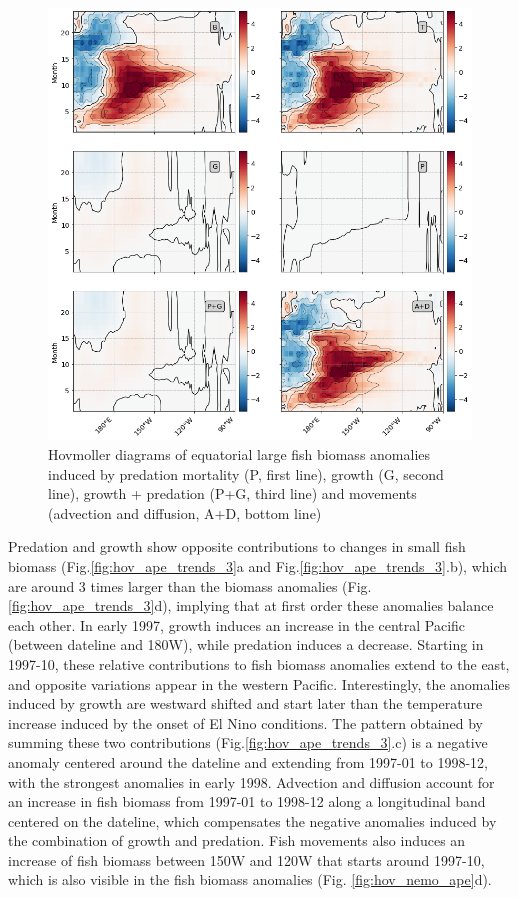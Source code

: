 \begin{figure}
	\centering
	\includegraphics[scale=0.4]{figs/hov_compo_l_90.png}	
	\caption{Hovmoller diagrams of equatorial large fish biomass anomalies induced by predation mortality (P, first line), growth (G, second line), growth + predation (P+G, third line) and movements (advection and diffusion, A+D, bottom line)}	
	\label{fig:hov_ape_trends_90}
\end{figure}


Predation and growth show opposite contributions to changes in small fish biomass (Fig.\ref{fig:hov_ape_trends_3}a and Fig.\ref{fig:hov_ape_trends_3}.b), which are around 3 times larger than the biomass anomalies (Fig. \ref{fig:hov_ape_trends_3}d), implying that at first order these anomalies balance each other. In early 1997, growth induces an increase in the central Pacific (between dateline and 180W), while predation induces a decrease. Starting in 1997-10, these relative contributions to fish biomass anomalies extend to the east, and opposite variations appear in the western Pacific. Interestingly, the anomalies induced by growth are westward shifted and start later than the temperature increase induced by the onset of El Nino conditions. The pattern obtained by summing these two contributions (Fig.\ref{fig:hov_ape_trends_3}.c) is a negative anomaly centered around the dateline and extending from 1997-01 to 1998-12, with the strongest anomalies in early 1998. Advection and diffusion account for an increase in fish biomass from 1997-01 to 1998-12 along a longitudinal band centered on the dateline, which compensates the negative anomalies induced by the combination of growth and predation. Fish movements also induces an increase of fish biomass between 150W and 120W that starts around 1997-10, which is also visible in the fish biomass anomalies (Fig. \ref{fig:hov_nemo_ape}d).

